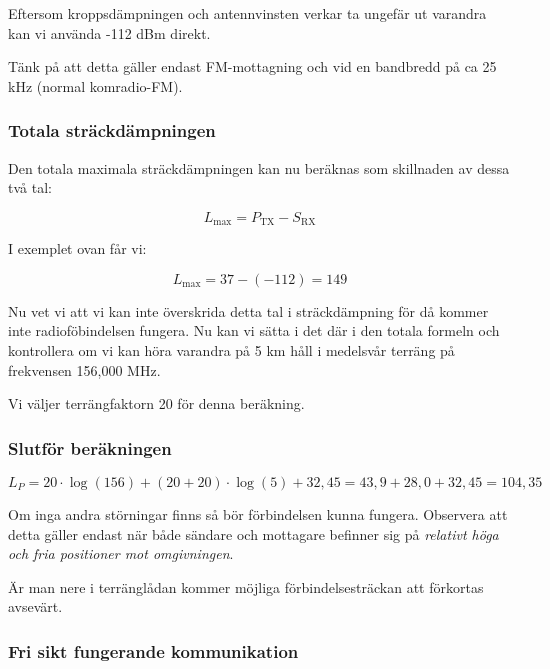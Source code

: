 Eftersom kroppsdämpningen och antennvinsten verkar ta ungefär ut varandra kan vi använda -112 dBm direkt.

Tänk på att detta gäller endast FM-mottagning och vid en bandbredd på ca 25 kHz (normal komradio-FM).

\subsubsection{Totala sträckdämpningen}

Den totala maximala sträckdämpningen kan nu beräknas som skillnaden av dessa två tal:

\begin{equation}
L_{\mathrm{max}} = P_{\mathrm{TX}} - S_{\mathrm{RX}}
\end{equation}

I exemplet ovan får vi:

\begin{equation}
L_{\mathrm{max}} = 37 - (-112) = 149
\end{equation}

Nu vet vi att vi kan inte överskrida detta tal i sträckdämpning för då kommer inte radioföbindelsen fungera. Nu kan vi sätta i det där i den totala formeln och kontrollera om vi kan höra varandra på 5 km håll i medelsvår terräng på frekvensen 156,000 MHz.

Vi väljer terrängfaktorn 20 för denna beräkning.

\subsubsection{Slutför beräkningen}

\begin{equation}
L_P=20\cdot\log(156)+(20+20)\cdot\log(5)+32,45 = 43,9 + 28,0 + 32,45 = 104,35
\end{equation}

Om inga andra störningar finns så bör förbindelsen kunna fungera. Observera att detta gäller endast när både sändare och mottagare befinner sig på \textit{relativt höga och fria positioner mot omgivningen}. 

Är man nere i terränglådan kommer möjliga förbindelsesträckan att förkortas avsevärt.

\subsubsection{Fri sikt fungerande kommunikation}

